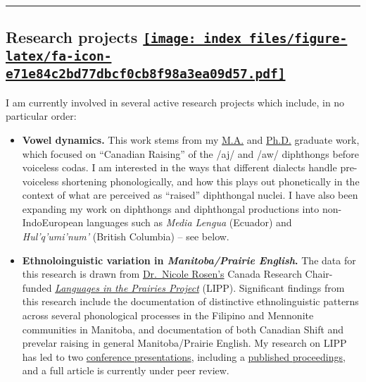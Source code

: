 \documentclass[
]{article}
\begin{document}
\begin{center}\rule{0.5\linewidth}{0.5pt}\end{center}

\hypertarget{projects}{%
\subsection[Research projects ]{\texorpdfstring{Research projects
\href{pdf/OnossonCV.pdf}{\protect\texttt{[image: index\_files/figure-latex/fa-icon-e71e84c2bd77dbcf0cb8f98a3ea09d57.pdf]}}}{Research projects }}\label{projects}}

I am currently involved in several active research projects which
include, in no particular order:

\begin{itemize}
\item
  \textbf{Vowel dynamics.} This work stems from my
  \href{pdf/Onosson\%20-\%202010\%20-\%20MA\%20Thesis.pdf}{M.A.} and
  \href{pdf/Onosson\%20-\%202018\%20-\%20PhD\%20Dissertation.pdf}{Ph.D.}
  graduate work, which focused on ``Canadian Raising'' of the /aj/ and
  /aw/ diphthongs before voiceless codas. I am interested in the ways
  that different dialects handle pre-voiceless shortening
  phonologically, and how this plays out phonetically in the context of
  what are perceived as ``raised'' diphthongal nuclei. I have also been
  expanding my work on diphthongs and diphthongal productions into
  non-IndoEuropean languages such as \emph{Media Lengua} (Ecuador) and
  \emph{Hul'q'umi'num'} (British Columbia) -- see below.
\item
  \textbf{Ethnoloinguistic variation in \emph{Manitoba/Prairie
  English}.} The data for this research is drawn from
  \href{https://home.cc.umanitoba.ca/~rosenn/}{Dr.~Nicole Rosen's}
  Canada Research Chair-funded
  \href{https://home.cc.umanitoba.ca/~rosenn/sace.html}{\emph{Languages
  in the Prairies Project}} (LIPP). Significant findings from this
  research include the documentation of distinctive ethnolinguistic
  patterns across several phonological processes in the Filipino and
  Mennonite communities in Manitoba, and documentation of both Canadian
  Shift and prevelar raising in general Manitoba/Prairie English. My
  research on LIPP has led to two
  \href{pdf/Onosson,\%20Rosen\%20-\%202020\%20-\%20American\%20Dialect\%20Society.pdf}{conference
  presentations}, including a
  \href{pdf/Onosson,\%20Rosen,\%20Li\%20-\%202019\%20-\%20ICPhS\%20Proceedings.pdf}{published
  proceedings}, and a full article is currently under peer review.

\end{itemize}
\end{document}
